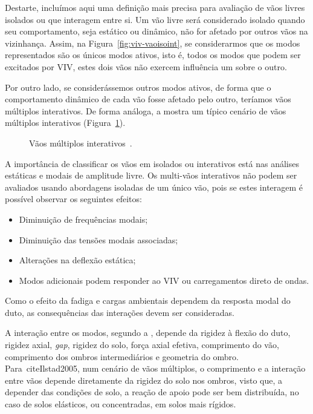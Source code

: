 Destarte, incluímos aqui uma definição mais precisa para avaliação de vãos livres isolados ou que interagem entre si.
Um vão livre será considerado isolado quando seu comportamento, seja estático ou dinâmico, não for afetado por outros vãos na vizinhança.
Assim, na Figura~\ref{fig:viv-vaoisoint}, se considerarmos que os modos representados são os únicos modos ativos, isto é, todos os modos que podem ser excitados por VIV, estes dois vãos não exercem influência um sobre o outro.

Por outro lado, se considerássemos outros modos ativos, de forma que o comportamento dinâmico de cada vão fosse afetado pelo outro, teríamos vãos múltiplos interativos.
De forma análoga, a  mostra um típico cenário de vãos múltiplos interativos (Figura~\ref{fig:viv-vaomult}).

\begin{figure}[hbt!]
\centering
\caption{Vãos múltiplos interativos~\cite{DNV2017}.}
\label{fig:viv-vaomult}

\end{figure}

A importância de classificar os vãos em isolados ou interativos está nas análises estáticas e modais de amplitude livre.
Os multi-vãos interativos não podem ser avaliados usando abordagens isoladas de um único vão, pois se estes interagem é possível observar os seguintes efeitos:

	\begin{itemize}
		\item Diminuição de frequências modais;
		\item Diminuição das tensões modais associadas;
		\item Alterações na deflexão estática;
		\item Modos adicionais podem responder ao VIV ou carregamentos direto de ondas.
	\end{itemize}

Como o efeito da fadiga e cargas ambientais dependem da resposta modal do duto, as consequências das interações devem ser consideradas.

A interação entre os modos, segundo a , depende da rigidez à flexão do duto, rigidez axial, \textit{gap}, rigidez do solo, força axial efetiva, comprimento do vão, comprimento dos ombros intermediários e geometria do ombro.
Para~cite{Ilstad2005}, num cenário de vãos múltiplos, o comprimento e a interação entre vãos depende diretamente da rigidez do solo nos ombros, visto que, a depender das condições de solo, a reação de apoio pode ser bem distribuída, no caso de solos elásticos, ou concentradas, em solos mais rígidos.

